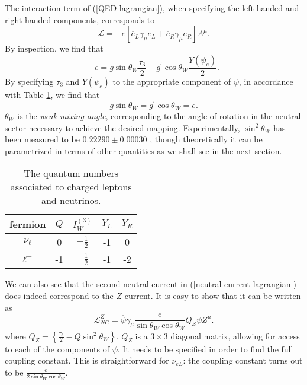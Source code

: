 \documentclass[10pt,a4paper]{book}
\begin{document}
The interaction term of (\ref{QED lagrangian}), when specifying the left-handed and right-handed components, corresponds to
\begin{equation}
\mathcal{L} = -e\left[ \overline{e}_L\gamma_\mu e_L + \overline{e}_R\gamma_\mu e_R
\right]A^\mu.
\end{equation} 
By inspection, we find that
\begin{equation}
-e = g\sin\theta_W \frac{\tau_3}{2} + g^\prime \cos\theta_W \frac{Y(\psi_{e})}{2}.
\end{equation}
By specifying $\tau_3$ and $Y(\psi_e)$ to the appropriate component of $\psi$, in accordance with Table \ref{quantum numbers}, we find that
\begin{equation}
g\sin\theta_W = g^\prime \cos\theta_W = e.
\end{equation}
$\theta_W$ is the \emph{weak mixing angle}, corresponding to the angle of rotation in the neutral sector necessary to achieve the desired mapping. Experimentally, $\sin^2\theta_W$ has been measured to be $0.22290 \pm 0.00030$ \cite{NIST}, though theoretically it can be parametrized in terms of other quantities as we shall see in the next section.


\begin{table} 
\begin{center}
\begin{tabular}{ccccc}
\hline 
fermion & $Q$ & $I^{(3)}_W$ & $Y_L$ & $Y_R$ \\ 
\hline 
$\nu_\ell$ & 0 & $+\frac{1}{2}$ & -1 & 0 \\ 
$\ell^-$ & -1 & $-\frac{1}{2}$ & -1 & -2 \\ 
\hline
\end{tabular}
\caption{The quantum numbers associated to charged leptons and neutrinos.}
\end{center}
\label{quantum numbers}
\end{table}

We can also see that the second neutral current in (\ref{neutral current lagrangian}) does indeed correspond to the $Z$ current. It is easy to show that it can be written as
\begin{equation}
\label{NC - Z}
\mathcal{L}_{NC}^{Z} = \overline{\psi}\gamma_\mu \frac{e}{\sin\theta_W \cos\theta_W} Q_Z \psi Z^\mu.
\end{equation}
where $Q_Z = \left\lbrace \frac{\tau_3}{2} - Q\sin^2\theta_W \right\rbrace$. $Q_Z$ is a $3\times 3$ diagonal matrix, allowing for access to each of the components of $\psi$. It needs to be specified in order to find the full coupling constant. This is straightforward for $\nu_{eL}$: the coupling constant turns out to be $\frac{e}{2\sin\theta_W\cos\theta_W}$. 
\end{document}
